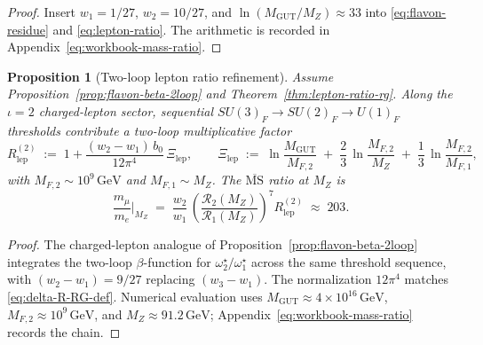 \documentclass[11pt]{article}
\theoremstyle{plain}
\newtheorem{proposition}[theorem]{Proposition}
\theoremstyle{definition}
\theoremstyle{remark}
\numberwithin{equation}{section}
\begin{document}
\begin{proof}
Insert $w_1=1/27$, $w_2=10/27$, and
$\ln(M_{\mathrm{GUT}}/M_Z)\approx33$ into \eqref{eq:flavon-residue} and
\eqref{eq:lepton-ratio}. The arithmetic is recorded in
Appendix~\eqref{eq:workbook-mass-ratio}.
\end{proof}

\begin{proposition}[Two-loop lepton ratio refinement]\label{prop:lepton-ratio-2loop}
Assume Proposition~\ref{prop:flavon-beta-2loop} and Theorem~\ref{thm:lepton-ratio-rg}.
Along the $\iota=2$ charged-lepton sector, sequential $SU(3)_F\to SU(2)_F\to
U(1)_F$ thresholds contribute a two-loop multiplicative factor
\begin{equation}\label{eq:lepton-R2}
  R_{\mathrm{lep}}^{(2)}
  \;:=\;
  1 + \frac{(w_2-w_1)\,b_0}{12\pi^4}\,\Xi_{\mathrm{lep}},
  \qquad
  \Xi_{\mathrm{lep}}
  \;:=\;
  \ln\!\frac{M_{\mathrm{GUT}}}{M_{F,2}}
  \;+\;
  \frac{2}{3}\,\ln\!\frac{M_{F,2}}{M_Z}
  \;+\;
  \frac{1}{3}\,\ln\!\frac{M_{F,2}}{M_{F,1}},
\end{equation}
with $M_{F,2}\sim10^{9}\,\mathrm{GeV}$ and $M_{F,1}\sim M_Z$. The
$\overline{\mathrm{MS}}$ ratio at $M_Z$ is
\begin{equation}\label{eq:lepton-ratio-2loop}
  \frac{m_\mu}{m_e}\Big|_{M_Z}
  \;=\;
  \frac{w_2}{w_1}\,
  \left(
    \frac{\mathcal{R}_2(M_Z)}{\mathcal{R}_1(M_Z)}
  \right)^{\!7}
  R_{\mathrm{lep}}^{(2)}
  \;\approx\;
  203.
\end{equation}
\end{proposition}

\begin{proof}
The charged-lepton analogue of Proposition~\ref{prop:flavon-beta-2loop}
integrates the two-loop $\beta$-function for $\omega^\star_2/\omega^\star_1$
across the same threshold sequence, with $(w_2-w_1)=9/27$ replacing
$(w_3-w_1)$. The normalization $12\pi^4$ matches
\eqref{eq:delta-R-RG-def}. Numerical evaluation uses
$M_{\mathrm{GUT}}\approx4\times10^{16}\,\mathrm{GeV}$,
$M_{F,2}\approx10^{9}\,\mathrm{GeV}$, and $M_Z\approx91.2\,\mathrm{GeV}$;
Appendix~\eqref{eq:workbook-mass-ratio} records the chain.
\end{proof}
\end{document}
